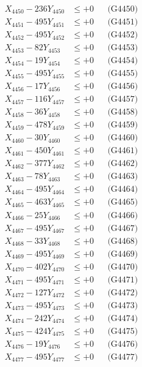\documentclass[a4paper,10pt]{article}
\begin{document}
{\begin{align}
X_{4450} - 236Y_{4450} &\leq +0 && \text{(G4450)} \\
\allowbreak
X_{4451} - 495Y_{4451} &\leq +0 && \text{(G4451)} \\
X_{4452} - 495Y_{4452} &\leq +0 && \text{(G4452)} \\
X_{4453} - 82Y_{4453} &\leq +0 && \text{(G4453)} \\
X_{4454} - 19Y_{4454} &\leq +0 && \text{(G4454)} \\
X_{4455} - 495Y_{4455} &\leq +0 && \text{(G4455)} \\
X_{4456} - 17Y_{4456} &\leq +0 && \text{(G4456)} \\
X_{4457} - 116Y_{4457} &\leq +0 && \text{(G4457)} \\
X_{4458} - 36Y_{4458} &\leq +0 && \text{(G4458)} \\
X_{4459} - 478Y_{4459} &\leq +0 && \text{(G4459)} \\
X_{4460} - 30Y_{4460} &\leq +0 && \text{(G4460)} \\
\allowbreak
X_{4461} - 450Y_{4461} &\leq +0 && \text{(G4461)} \\
X_{4462} - 377Y_{4462} &\leq +0 && \text{(G4462)} \\
X_{4463} - 78Y_{4463} &\leq +0 && \text{(G4463)} \\
X_{4464} - 495Y_{4464} &\leq +0 && \text{(G4464)} \\
X_{4465} - 463Y_{4465} &\leq +0 && \text{(G4465)} \\
X_{4466} - 25Y_{4466} &\leq +0 && \text{(G4466)} \\
X_{4467} - 495Y_{4467} &\leq +0 && \text{(G4467)} \\
X_{4468} - 33Y_{4468} &\leq +0 && \text{(G4468)} \\
X_{4469} - 495Y_{4469} &\leq +0 && \text{(G4469)} \\
X_{4470} - 402Y_{4470} &\leq +0 && \text{(G4470)} \\
\allowbreak
X_{4471} - 495Y_{4471} &\leq +0 && \text{(G4471)} \\
X_{4472} - 127Y_{4472} &\leq +0 && \text{(G4472)} \\
X_{4473} - 495Y_{4473} &\leq +0 && \text{(G4473)} \\
X_{4474} - 242Y_{4474} &\leq +0 && \text{(G4474)} \\
X_{4475} - 424Y_{4475} &\leq +0 && \text{(G4475)} \\
X_{4476} - 19Y_{4476} &\leq +0 && \text{(G4476)} \\
X_{4477} - 495Y_{4477} &\leq +0 && \text{(G4477)} \\

\end{align}}
\end{document}
